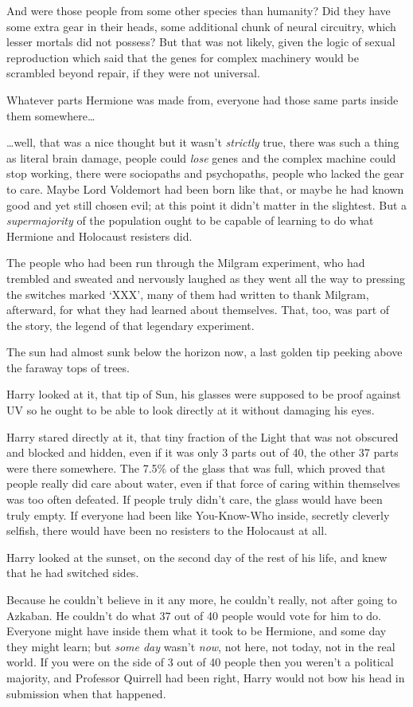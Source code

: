 And were those people from some other species than humanity? Did they have some
extra gear in their heads, some additional chunk of neural circuitry, which
lesser mortals did not possess? But that was not likely, given the logic of
sexual reproduction which said that the genes for complex machinery would be
scrambled beyond repair, if they were not universal.

Whatever parts Hermione was made from, everyone had those same parts inside
them somewhere…

…well, that was a nice thought but it wasn't \emph{strictly} true, there
was such a thing as literal brain damage, people could \emph{lose} genes and
the complex machine could stop working, there were sociopaths and psychopaths,
people who lacked the gear to care. Maybe Lord Voldemort had been born like
that, or maybe he had known good and yet still chosen evil; at this point it
didn't matter in the slightest. But a \emph{supermajority} of the population
ought to be capable of learning to do what Hermione and Holocaust resisters did.

The people who had been run through the Milgram experiment, who had trembled
and sweated and nervously laughed as they went all the way to pressing the
switches marked `XXX', many of them had written to thank Milgram, afterward,
for what they had learned about themselves. That, too, was part of the story,
the legend of that legendary experiment.

The sun had almost sunk below the horizon now, a last golden tip peeking above
the faraway tops of trees.

Harry looked at it, that tip of Sun, his glasses were supposed to be proof
against UV so he ought to be able to look directly at it without damaging his
eyes.

Harry stared directly at it, that tiny fraction of the Light that was not
obscured and blocked and hidden, even if it was only 3 parts out of 40, the
other 37 parts were there somewhere. The 7.5\% of the glass that was full, which
proved that people really did care about water, even if that force of caring
within themselves was too often defeated. If people truly didn't care, the
glass would have been truly empty. If everyone had been like You-Know-Who
inside, secretly cleverly selfish, there would have been no resisters to the
Holocaust at all.

Harry looked at the sunset, on the second day of the rest of his life, and knew
that he had switched sides.

Because he couldn't believe in it any more, he couldn't really, not after going
to Azkaban. He couldn't do what 37 out of 40 people would vote for him to do.
Everyone might have inside them what it took to be Hermione, and some day they
might learn; but \emph{some day} wasn't \emph{now}, not here, not today, not in
the real world. If you were on the side of 3 out of 40 people then you weren't
a political majority, and Professor Quirrell had been right, Harry would not
bow his head in submission when that happened.

